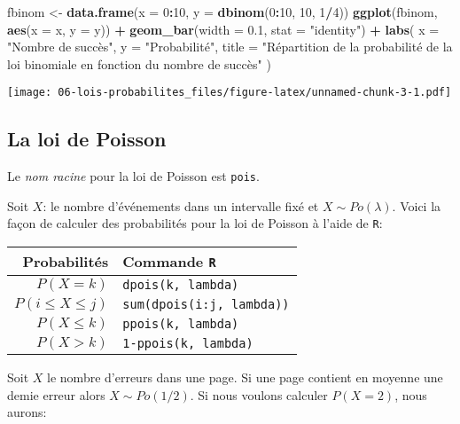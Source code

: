 \documentclass[]{book}
\newenvironment{Shaded}{\begin{snugshade}}{\end{snugshade}}
\newcommand{\KeywordTok}[1]{\textcolor[rgb]{0.13,0.29,0.53}{\textbf{#1}}}
\newcommand{\DataTypeTok}[1]{\textcolor[rgb]{0.13,0.29,0.53}{#1}}
\newcommand{\DecValTok}[1]{\textcolor[rgb]{0.00,0.00,0.81}{#1}}
\newcommand{\FloatTok}[1]{\textcolor[rgb]{0.00,0.00,0.81}{#1}}
\newcommand{\StringTok}[1]{\textcolor[rgb]{0.31,0.60,0.02}{#1}}
\newcommand{\OperatorTok}[1]{\textcolor[rgb]{0.81,0.36,0.00}{\textbf{#1}}}
\newcommand{\NormalTok}[1]{#1}
\begin{document}
\begin{Shaded}
\begin{Highlighting}[]
\NormalTok{fbinom <-}\StringTok{ }\KeywordTok{data.frame}\NormalTok{(}\DataTypeTok{x =} \DecValTok{0}\OperatorTok{:}\DecValTok{10}\NormalTok{, }\DataTypeTok{y =} \KeywordTok{dbinom}\NormalTok{(}\DecValTok{0}\OperatorTok{:}\DecValTok{10}\NormalTok{, }\DecValTok{10}\NormalTok{, }\DecValTok{1}\OperatorTok{/}\DecValTok{4}\NormalTok{))}
\KeywordTok{ggplot}\NormalTok{(fbinom, }\KeywordTok{aes}\NormalTok{(}\DataTypeTok{x =}\NormalTok{ x, }\DataTypeTok{y =}\NormalTok{ y)) }\OperatorTok{+}
\StringTok{  }\KeywordTok{geom_bar}\NormalTok{(}\DataTypeTok{width =} \FloatTok{0.1}\NormalTok{, }\DataTypeTok{stat =} \StringTok{"identity"}\NormalTok{) }\OperatorTok{+}
\StringTok{  }\KeywordTok{labs}\NormalTok{(}
    \DataTypeTok{x =} \StringTok{"Nombre de succès"}\NormalTok{,}
    \DataTypeTok{y =} \StringTok{"Probabilité"}\NormalTok{,}
    \DataTypeTok{title =} \StringTok{"Répartition de la probabilité de la loi binomiale en fonction du nombre de succès"}
\NormalTok{  )}
\end{Highlighting}
\end{Shaded}

\texttt{[image: 06-lois-probabilites\_files/figure-latex/unnamed-chunk-3-1.pdf]}

\subsection{La loi de Poisson}\label{la-loi-de-poisson}

Le \emph{nom racine} pour la loi de Poisson est \texttt{pois}.

Soit \(X\): le nombre d'événements dans un intervalle fixé et
\(X\sim Po(\lambda)\). Voici la façon de calculer des probabilités pour
la loi de Poisson à l'aide de \texttt{R}:

\begin{longtable}[]{@{}rl@{}}
\toprule
Probabilités & Commande \texttt{R}\tabularnewline
\midrule
\endhead
\(P(X=k)\) & \texttt{dpois(k,\ lambda)}\tabularnewline
\(P(i\leq X \leq j)\) & \texttt{sum(dpois(i:j,\ lambda))}\tabularnewline
\(P(X\leq k)\) & \texttt{ppois(k,\ lambda)}\tabularnewline
\(P(X>k)\) & \texttt{1-ppois(k,\ lambda)}\tabularnewline
\bottomrule
\end{longtable}

Soit \(X\) le nombre d'erreurs dans une page. Si une page contient en
moyenne une demie erreur alors \(X\sim Po(1/2)\). Si nous voulons
calculer \(P(X=2)\), nous aurons:
\end{document}
